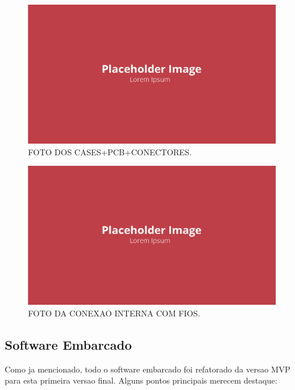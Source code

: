 \begin{figure}[!ht]
    \centering
    \includegraphics[width=.8\linewidth]{figuras/placeholder.png}
    \caption{FOTO DOS CASES+PCB+CONECTORES\cite{autor}.}
    \label{fig:placeholder}
\end{figure}

\begin{figure}[!ht]
    \centering
    \includegraphics[width=.8\linewidth]{figuras/placeholder.png}
    \caption{FOTO DA CONEXAO INTERNA COM FIOS\cite{autor}.}
    \label{fig:placeholder}
\end{figure}

\subsection{Software Embarcado}

Como ja mencionado, todo o software embarcado foi refatorado da versao MVP para esta primeira versao final. Alguns pontos principais merecem destaque:

